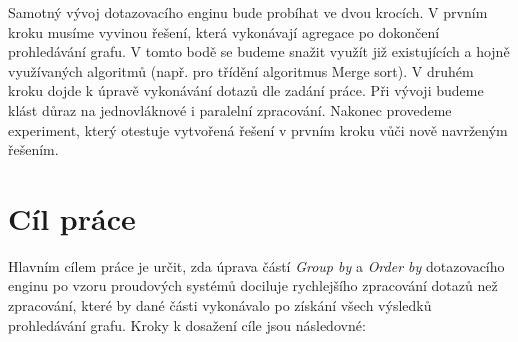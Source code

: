 Samotný vývoj dotazovacího enginu bude probíhat ve dvou krocích.
V prvním kroku musíme vyvinou řešení, která vykonávají agregace po dokončení prohledávání grafu.
V tomto bodě se budeme snažit využít již existujících a hojně využívaných algoritmů (např. pro třídění algoritmus Merge sort). 
V druhém kroku dojde k úpravě vykonávání dotazů dle zadání práce.
Při vývoji budeme klást důraz na jednovláknové i paralelní zpracování.
Nakonec provedeme experiment, který otestuje vytvořená řešení v prvním kroku vůči nově navrženým řešením.

\section*{Cíl práce}

Hlavním cílem práce je určit, zda úprava částí \textit{Group by} a \textit{Order by} dotazovacího enginu po vzoru proudových systémů dociluje rychlejšího zpracování dotazů než zpracování, které by dané části vykonávalo po získání všech výsledků prohledávání grafu.
Kroky k dosažení cíle jsou následovné:
